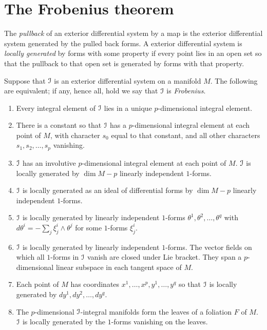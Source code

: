 \section{The Frobenius theorem}
The \emph{pullback} of an exterior differential system by a map is the exterior differential system generated by the pulled back forms.
A exterior differential system is \emph{locally generated} by forms with some property if every point lies in an open set so that the pullback to that open set is generated by forms with that property.
\begin{theorem}[Frobenius]
Suppose that \(\mathcal{I}\) is an exterior differential system on a manifold \(M\).
The following are equivalent; if any, hence all, hold we say that \(\mathcal{I}\) is \emph{Frobenius}.
\begin{enumerate}
\item 
Every integral element of \(\mathcal{I}\) lies in a unique \(p\)-dimensional integral element.
\item
There is a constant so that \(\mathcal{I}\) has a \(p\)-dimensional integral element at each point of \(M\), with character \(s_0\) equal to that constant, and all other characters \(s_1,s_2,\dots,s_p\) vanishing.
\item
\(\mathcal{I}\) has an involutive \(p\)-dimensional integral element at each point of \(M\).
\(\mathcal{I}\) is locally generated by \(\dim M - p\) linearly independent \(1\)-forms.
\item
\(\mathcal{I}\) is locally generated as an ideal of differential forms by \(\dim M - p\) linearly independent \(1\)-forms.
\item
\(\mathcal{I}\) is locally generated by linearly independent \(1\)-forms \(\theta^1,\theta^2,\dots,\theta^q\) with \(d\theta^i=-\sum_j \xi^i_j \wedge \theta^j\) for some \(1\)-forms \(\xi^i_j\).
\item 
\(\mathcal{I}\) is locally generated by linearly independent \(1\)-forms.
The vector fields on which all \(1\)-forms in \(\mathcal{I}\) vanish are closed under Lie bracket.
They span a \(p\)-dimensional linear subspace in each tangent space of \(M\). 
\item
Each point of \(M\) has coordinates \(x^1,\dots,x^p,y^1,\dots,y^q\) so that \(\mathcal{I}\) is locally generated by \(dy^1,dy^2,\dots,dy^q\).
\item
The \(p\)-dimensional \(\mathcal{I}\)-integral manifolds form the leaves of a foliation \(F\) of \(M\). \(\mathcal{I}\) is locally generated by the \(1\)-forms vanishing on the leaves.
\end{enumerate}
\end{theorem}
